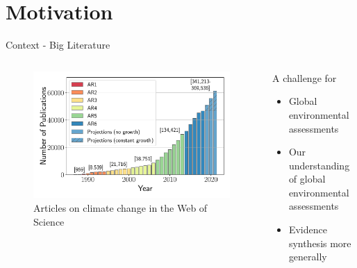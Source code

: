 \documentclass[9pt, aspectratio=169]{beamer}
\begin{document}
\section{Motivation}
\frame{\tableofcontents[currentsection]}

\begin{frame}{Context - Big Literature}
\begin{columns}
	\begin{column}{0.618\linewidth} %
		\begin{figure}
			\includegraphics[width=\linewidth]{../plots/literature_size/pubs_time_wgb_lp.pdf}
			\caption{Articles on climate change in the Web of Science}
		\end{figure}
	\end{column}
	\begin{column}{0.382\linewidth}
		A challenge for
		\begin{itemize}
			\item Global environmental assessments
			\item Our understanding of global environmental assessments
			\item Evidence synthesis more generally
		\end{itemize}
	\end{column}
\end{columns}
\end{frame}
\end{document}
